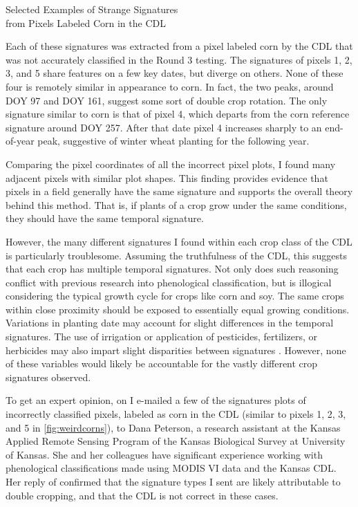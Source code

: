 \begin{ssfigure}
  \centering
  
  \caption[Selected Examples of Strange Signatures from Pixels Labeled Corn in the CDL]{Selected Examples of Strange Signatures\\from Pixels Labeled Corn in the CDL}
  \label{fig:weirdcorns}
  \medskip
  \small
  Each of these signatures was extracted from a pixel labeled corn by the CDL that was not accurately classified in the Round 3 testing. The signatures of pixels 1, 2, 3, and 5 share features on a few key dates, but diverge on others. None of these four is remotely similar in appearance to corn. In fact, the two peaks, around DOY 97 and DOY 161, suggest some sort of double crop rotation. The only signature similar to corn is that of pixel 4, which departs from the corn reference signature around DOY 257. After that date pixel 4 increases sharply to an end-of-year peak, suggestive of winter wheat planting for the following year.
\end{ssfigure}

Comparing the pixel coordinates of all the incorrect pixel plots, I found many adjacent pixels with similar plot shapes. This finding provides evidence that pixels in a field generally have the same signature and supports the overall theory behind this method. That is, if plants of a crop grow under the same conditions, they should have the same temporal signature.

However, the many different signatures I found within each crop class of the CDL is particularly troublesome. Assuming the truthfulness of the CDL, this suggests that each crop has multiple temporal signatures. Not only does such reasoning conflict with previous research into phenological classification, but is illogical considering the typical growth cycle for crops like corn and soy. The same crops within close proximity should be exposed to essentially equal growing conditions. Variations in planting date may account for slight differences in the temporal signatures. The use of irrigation or application of pesticides, fertilizers, or herbicides may also impart slight disparities between signatures \autocites{wardlow2005state-level}{wardlow2007analysis}{wardlow2008large-area}{sakamoto2010a-two-step}. However, none of these variables would likely be accountable for the vastly different crop signatures observed.

To get an expert opinion, on  I e-mailed a few of the signatures plots of incorrectly classified pixels, labeled as corn in the CDL (similar to pixels 1, 2, 3, and 5 in \cref{fig:weirdcorns}), to Dana Peterson, a research assistant at the Kansas Applied Remote Sensing Program of the Kansas Biological Survey at University of Kansas. She and her colleagues have significant experience working with phenological classifications made using MODIS VI data and the Kansas CDL. Her reply of  confirmed that the signature types I sent are likely attributable to double cropping, and that the CDL is not correct in these cases.

